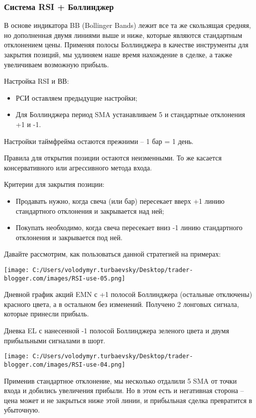 \documentclass[a5paper]{article}
\begin{document}
\subsubsection{Система RSI + Боллинджер}

В основе индикатора BB (Bollinger Bands) лежит все та же скользящая средняя, но дополненная двумя линиями выше и ниже, которые являются стандартным отклонением цены. Применяя полосы Боллинджера в качестве инструменты для закрытия позиций, мы удлиняем наше время нахождение в сделке, а также увеличиваем возможную прибыль.

Настройка RSI и ВВ:
\begin{itemize}
\item     РСИ оставляем предыдущие настройки;
\item     Для Боллинджера период SMA устанавливаем 5 и стандартные отклонения +1 и -1.
\end{itemize}

Настройки таймфрейма остаются прежними – 1 бар = 1 день.

Правила для открытия позиции остаются неизменными. То же касается консервативного или агрессивного метода входа.

Критерии для закрытия позиции:
\begin{itemize}
\item     Продавать нужно, когда свеча (или бар) пересекает вверх +1 линию стандартного отклонения и закрывается над ней;
\item     Покупать необходимо, когда свеча пересекает вниз -1 линию стандартного отклонения и закрывается под ней.
\end{itemize}

Давайте рассмотрим, как пользоваться данной стратегией на примерах:

\texttt{[image: C:/Users/volodymyr.turbaevsky/Desktop/trader-blogger.com/images/RSI-use-05.png]}

Дневной график акций EMN с +1 полосой Боллинджера (остальные отключены) красного цвета, а в остальном без изменений. Получено 2 лонговых сигнала, которые принесли прибыль.

Дневка EL с нанесенной -1 полосой Боллинджера зеленого цвета и двумя прибыльными сигналами в шорт.

\texttt{[image: C:/Users/volodymyr.turbaevsky/Desktop/trader-blogger.com/images/RSI-use-04.png]}

Применив стандартное отклонение, мы несколько отдалили 5 SMA от точки входа и добились увеличения прибыли. Но в этом есть и негативная сторона – цена может и не закрыться ниже этой линии, и прибыльная сделка превратится в убыточную.
\end{document}
